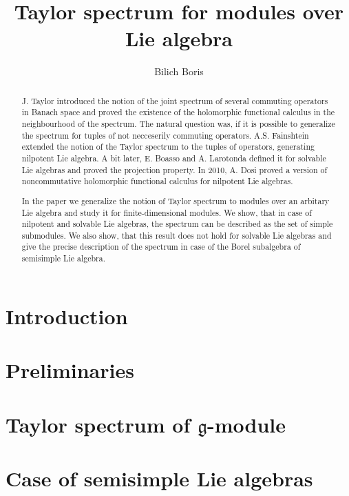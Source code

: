 \documentclass[letterpaper]{amsart}
\author{Bilich Boris}
\title{Taylor spectrum for modules over Lie algebra}
\newcommand{\lieg}{\mathfrak{g}}
\begin{document}
\maketitle

\begin{abstract}
    J. Taylor \cite{Taylor1970} introduced the notion of the joint spectrum of several commuting
    operators in Banach space and proved the existence of the holomorphic functional calculus in
    the neighbourhood of the spectrum. The natural question was, if it is possible to generalize
    the spectrum for tuples of not necceserily commuting operators. A.S. Fainshtein extended the
    notion of the Taylor spectrum to the tuples of operators, generating nilpotent Lie algebra. A
    bit later, E. Boasso and A. Larotonda defined it for solvable Lie algebras and proved the
    projection property. In 2010, A. Dosi proved a version of noncommutative holomorphic functional
    calculus for nilpotent Lie algebras.
    
    In the paper we generalize the notion of Taylor spectrum to modules over an arbitary Lie
    algebra and study it for finite-dimensional modules. We show, that in case of nilpotent and
    solvable Lie algebras, the spectrum can be described as the set of simple submodules. We also
    show, that this result does not hold for solvable Lie algebras and give the precise description
    of the spectrum in case of the Borel subalgebra of semisimple Lie algebra.
\end{abstract}

\tableofcontents
\section{Introduction}%
\label{sec:introduction}


\section{Preliminaries}%
\label{sec:preliminaries}


\section{Taylor spectrum of \texorpdfstring{$\lieg$-module}{g-module}}%
\label{sec:spectrumofmodule}


\section{Case of semisimple Lie algebras}%
\label{sec:semisimple}

\end{document}
